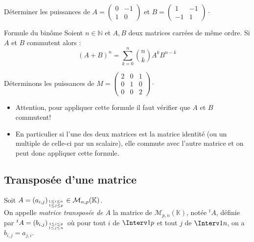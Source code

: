 \documentclass[a4paper,10pt]{report}
\begin{document}
\begin{ApplicationDirecte} Déterminer les puissances de $A = \begin{pmatrix}0&-1\\1&0\end{pmatrix}$ et $B=\begin{pmatrix} 1&-1\\-1&1\end{pmatrix}\cdot$
\end{ApplicationDirecte}

\begin{Theoreme}{Formule du binôme}
Soient $n\in \mathbb{N}$ et $A,B$ deux matrices carrées de même ordre. Si $A$ et $B$ commutent alors :
\[ (A+B)^n = \sum_{k=0}^n \binom{n}{k} A^k B^{n-k} \]
\end{Theoreme}

\begin{Exemple} Déterminons les puissances de $M = \begin{pmatrix}
2 & 0 & 1 \\
0 & 1 & 0 \\
0 & 0 & 2
\end{pmatrix}\cdot$

\vspace{10cm}
\end{Exemple}

\begin{Remarques}{}
\begin{itemize}
\item Attention, pour appliquer cette formule il faut vérifier que $A$ et $B$ commutent!
\item En particulier si l'une des deux matrices est la matrice identité (ou un multiple de celle-ci par un scalaire), elle commute avec l'autre matrice et on peut donc appliquer cette formule.
\end{itemize}
\end{Remarques}{}

\subsection{Transposée d'une matrice}
\begin{Definition}{}
 
Soit $A=(a_{i,j})_{{1 \leq i \leq n}\atop{1 \leq j \leq p}} \in \mathcal{M}_{n,p}(\mathbb{K})$.\\


On appelle \emph{matrice transposée de $A$} la matrice de $\mathcal{M}_{p,n}(\mathbb{K})$, notée $^tA$, définie par \linebreak $^tA=(b_{i,j})_{{1 \leq i \leq p}\atop{1 \leq j \leq n}}$  où pour tout  $i$ de $\Interv 1p$ et tout $j$ de $\Interv 1n$, on a $b_{i,j}= a_{j,i}.$
\end{Definition}
\end{document}
